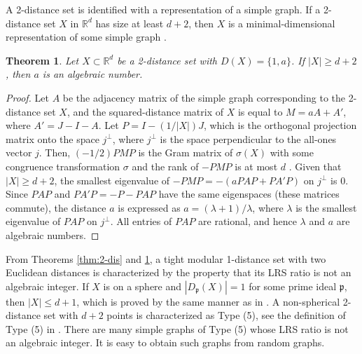 \documentclass[a4paper, 11pt]{article}
\newcommand{\R}{\mathbb{R}}
\newcommand{\p}{\mathfrak{p}}
\newtheorem{theorem}{Theorem}[section]
\theoremstyle{definition}
\begin{document}
A 2-distance set is identified with a representation of a simple graph. If a 2-distance set $X$ in $\R^d$ has size at least $d+2$, then $X$ is a minimal-dimensional representation of some simple graph \cite{ES66,R10}. 

\begin{theorem}\label{thm:a}
Let $X \subset \mathbb{R}^d$ be a 2-distance set with $D(X)=\{1,a \}$. If $|X| \geq d+2$, then $a$ is an algebraic number.  
\end{theorem}
\begin{proof}
Let $A$ be the adjacency matrix of the simple graph corresponding to the 2-distance set $X$, and  
the squared-distance matrix of $X$ is equal to $M=aA+ A'$, where $A'=J-I-A$. 
Let $P=I-(1/|X|)J$, which is the orthogonal projection matrix onto the space $j^{\perp}$, where $j^{\perp}$ is the space perpendicular to the all-ones vector $j$. 
Then, $(-1/2)PMP$ is the Gram matrix of $\sigma(X)$ with some congruence transformation $\sigma$ and the rank of $-PMP$ is at most $d$ \cite{N81}. 
Given that $|X| \geq d+2$, the smallest eigenvalue of $-PMP = -(aPAP + PA'P)$ on $j^\perp$ is 0. 
Since $PAP$ and $PA'P=-P-PAP$ have the same eigenspaces (these matrices commute), the distance $a$ is expressed as $a = (\lambda+1)/\lambda$, where $\lambda$ is the smallest eigenvalue of $PAP$ on $j^\perp$.  
All entries of $PAP$ are rational, and hence $\lambda$ and $a$ are algebraic numbers. 
\end{proof}
From Theorems \ref{thm:2-dis} and \ref{thm:a}, 
a tight modular 1-distance set with two Euclidean distances is characterized by the property that its LRS ratio is not an algebraic integer. 
If $X$ is on a sphere and $|D_\p(X)|=1$ for some prime ideal $\p$, then $|X| \leq d+1$, which is proved by the same manner as in \cite{NX}. 
A non-spherical 2-distance set with $d+2$ points is characterized as Type (5), see the definition of Type (5) in \cite[Theorem 2.4]{NS12}.  
There are many simple graphs of Type (5) whose LRS ratio is not an algebraic integer. 
It is easy to obtain such graphs from random graphs. 
\end{document}
